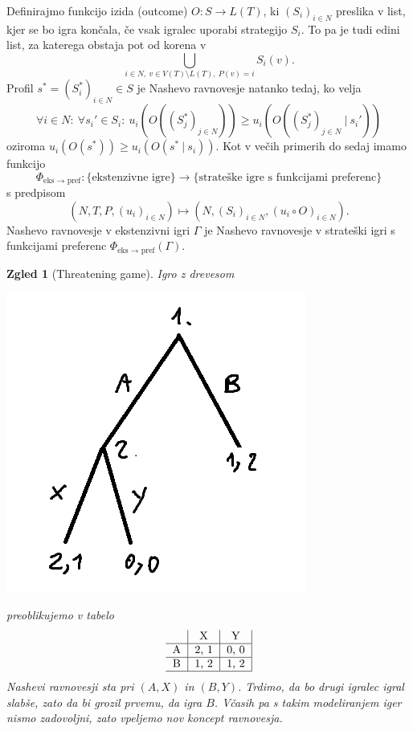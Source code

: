 \documentclass[10pt, a4paper]{article}
\newtheorem{zgled}[izr]{Zgled}
\begin{document}
Definirajmo funkcijo izida (outcome) $O: S \to L(T)$, ki $(S_i)_{i \in N}$ preslika v list,
kjer se bo igra končala, če vsak igralec uporabi strategijo $S_i$.
To pa je tudi edini list, za katerega obstaja pot od korena v $$\bigcup_{i \in N,\ v \in V(T) \setminus L(T),\ P(v) = i} S_i (v).$$
Profil $s^* = (S_i^*)_{i \in N} \in S$ je Nashevo ravnovesje natanko tedaj, ko velja 
$$\forall i \in N:\ \forall s_i' \in S_i:\ u_i (O((S_j^*)_{j \in N})) \geq u_i (O((S_j^*)_{j \in N}\ |\ s_i'))$$ 
oziroma $u_i (O(s^*)) \geq u_i (O(s^*\ |\ s_i))$. Kot v večih primerih do sedaj imamo 
funkcijo 
$$\Phi_{\text{eks $\to$ pref}}: \{\text{ekstenzivne igre}\} \to \{\text{strateške igre s funkcijami preferenc}\}$$
s predpisom $$(N, T, P, (u_i)_{i \in N}) \mapsto (N, (S_i)_{i \in N}, (u_i \circ O)_{i \in N}).$$
Nashevo ravnovesje v ekstenzivni igri $\Gamma$ je Nashevo ravnovesje v strateški igri s funkcijami preferenc 
$\Phi_{\text{eks $\to$ pref}}(\Gamma)$.

\begin{zgled}[Threatening game]
  Igro z drevesom 
  \begin{center}
    \includegraphics[scale=0.7]{drevo_4.png}
  \end{center}
  preoblikujemo v tabelo 
  $$  
  {\begin{tabular}{c|c|c|c|}
    & \textrm{X} & \textrm{Y}\\
    \hline
    \textrm{A} & 2, 1 & 0, 0\\
    \hline
    \textrm{B} & 1, 2 & 1, 2\\
    \hline
  \end{tabular}}
  $$
  Nashevi ravnovesji sta pri $(A, X)$ in $(B, Y)$. Trdimo, da bo drugi igralec igral slabše, zato da bi grozil prvemu,
  da igra $B$. Včasih pa s takim modeliranjem iger nismo zadovoljni, zato vpeljemo nov koncept ravnovesja.
\end{zgled}
\end{document}
